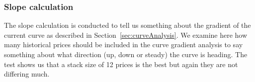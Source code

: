 \begin{table}[H]
\centering  %
\caption{Number of historical prices to include in the skewness calculation} %
\label{table:SkewnessTest} %
\end{table}

\subsubsection{Slope calculation}
The slope calculation is conducted to tell us something about the gradient of the current curve as described in Section~\ref{sec:curveAnalysis}. We examine here how many historical prices should be included in the curve gradient analysis to say something about what direction (up, down or steady) the curve is heading. The test shows us that a stack size of 12 prices is the best but again they are not differing much.

